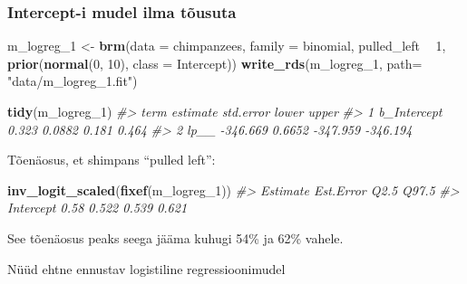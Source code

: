 \documentclass[]{book}
\newenvironment{Shaded}{\begin{snugshade}}{\end{snugshade}}
\newcommand{\CommentTok}[1]{\textcolor[rgb]{0.56,0.35,0.01}{\textit{#1}}}
\newcommand{\DataTypeTok}[1]{\textcolor[rgb]{0.13,0.29,0.53}{#1}}
\newcommand{\DecValTok}[1]{\textcolor[rgb]{0.00,0.00,0.81}{#1}}
\newcommand{\KeywordTok}[1]{\textcolor[rgb]{0.13,0.29,0.53}{\textbf{#1}}}
\newcommand{\NormalTok}[1]{#1}
\newcommand{\OperatorTok}[1]{\textcolor[rgb]{0.81,0.36,0.00}{\textbf{#1}}}
\newcommand{\StringTok}[1]{\textcolor[rgb]{0.31,0.60,0.02}{#1}}
\begin{document}
\hypertarget{intercept-i-mudel-ilma-tousuta}{%
\subsubsection*{Intercept-i mudel ilma tõusuta}\label{intercept-i-mudel-ilma-tousuta}}

\begin{Shaded}
\begin{Highlighting}[]
\NormalTok{m_logreg_}\DecValTok{1}\NormalTok{ <-}\StringTok{ }\KeywordTok{brm}\NormalTok{(}\DataTypeTok{data =}\NormalTok{ chimpanzees, }
                  \DataTypeTok{family =}\NormalTok{ binomial,}
\NormalTok{                  pulled_left }\OperatorTok{~}\StringTok{ }\DecValTok{1}\NormalTok{,}
                  \KeywordTok{prior}\NormalTok{(}\KeywordTok{normal}\NormalTok{(}\DecValTok{0}\NormalTok{, }\DecValTok{10}\NormalTok{), }\DataTypeTok{class =}\NormalTok{ Intercept))}
\KeywordTok{write_rds}\NormalTok{(m_logreg_}\DecValTok{1}\NormalTok{, }\DataTypeTok{path=} \StringTok{"data/m_logreg_1.fit"}\NormalTok{)}
\end{Highlighting}
\end{Shaded}

\begin{Shaded}
\begin{Highlighting}[]
\KeywordTok{tidy}\NormalTok{(m_logreg_}\DecValTok{1}\NormalTok{)}
\CommentTok{#>          term estimate std.error    lower    upper}
\CommentTok{#> 1 b_Intercept    0.323    0.0882    0.181    0.464}
\CommentTok{#> 2        lp__ -346.669    0.6652 -347.959 -346.194}
\end{Highlighting}
\end{Shaded}

Tõenäosus, et shimpans ``pulled left'':

\begin{Shaded}
\begin{Highlighting}[]
\KeywordTok{inv_logit_scaled}\NormalTok{(}\KeywordTok{fixef}\NormalTok{(m_logreg_}\DecValTok{1}\NormalTok{))}
\CommentTok{#>           Estimate Est.Error  Q2.5 Q97.5}
\CommentTok{#> Intercept     0.58     0.522 0.539 0.621}
\end{Highlighting}
\end{Shaded}

See tõenäosus peaks seega jääma kuhugi 54\% ja 62\% vahele.

Nüüd ehtne ennustav logistiline regressioonimudel
\end{document}
